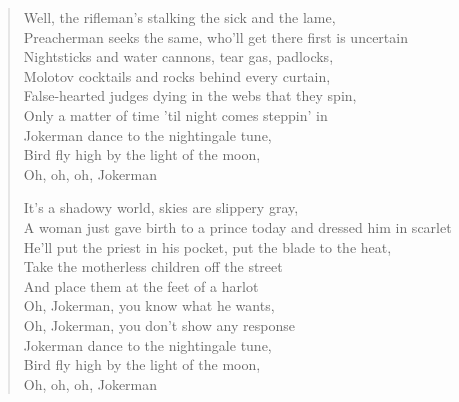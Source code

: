\begin{verse}
Well, the rifleman's stalking the sick and the lame, \\
Preacherman seeks the same, who'll get there first is uncertain \\
Nightsticks and water cannons, tear gas, padlocks, \\
Molotov cocktails and rocks behind every curtain, \\
False-hearted judges dying in the webs that they spin, \\
Only a matter of time 'til night comes steppin' in \\
Jokerman dance to the nightingale tune, \\
Bird fly high by the light of the moon, \\
Oh, oh, oh, Jokerman

It's a shadowy world, skies are slippery gray, \\
A woman just gave birth to a prince today and dressed him in scarlet \\
He'll put the priest in his pocket, put the blade to the heat, \\
Take the motherless children off the street \\
And place them at the feet of a harlot \\
Oh, Jokerman, you know what he wants, \\
Oh, Jokerman, you don't show any response \\
Jokerman dance to the nightingale tune, \\
Bird fly high by the light of the moon, \\
Oh, oh, oh, Jokerman
\end{verse}

